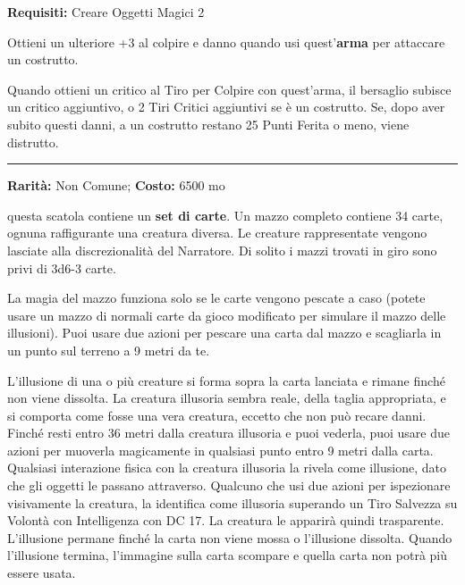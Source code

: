 \begin{multicols}{2}
\textbf{Requisiti:} Creare Oggetti Magici 2

Ottieni un ulteriore +3 al colpire e danno quando usi quest'\textbf{arma} per attaccare un costrutto.

Quando ottieni un critico al Tiro per Colpire con quest'arma, il bersaglio subisce un critico aggiuntivo, o 2 Tiri Critici aggiuntivi se è un costrutto. Se, dopo aver subito questi danni, a un costrutto restano 25 Punti Ferita o meno, viene distrutto.

\smallskip\noindent\rule{\linewidth}{2pt}  \hypertarget{MazzodelleIllusioni}{}\medskip{}\noindent\label{MazzodelleIllusioni}

\textbf{Rarità:} Non Comune; \textbf{Costo:} 6500 mo

questa scatola contiene un \textbf{set di carte}. Un mazzo completo contiene 34 carte, ognuna raffigurante una creatura diversa. Le creature rappresentate vengono lasciate alla discrezionalità del Narratore. Di solito i mazzi trovati in giro sono privi di 3d6-3 carte.

La magia del mazzo funziona solo se le carte vengono pescate a caso (potete usare un mazzo di normali carte da gioco modificato per simulare il mazzo delle illusioni). Puoi usare due azioni per pescare una carta dal mazzo e scagliarla in un punto sul terreno a 9 metri da te.

L'illusione di una o più creature si forma sopra la carta lanciata e rimane finché non viene dissolta. La creatura illusoria sembra reale, della taglia appropriata, e si comporta come fosse una vera creatura, eccetto che non può recare danni. Finché resti entro 36 metri dalla creatura illusoria e puoi vederla, puoi usare due azioni per muoverla magicamente in qualsiasi punto entro 9 metri dalla carta. Qualsiasi interazione fisica con la creatura illusoria la rivela come illusione, dato che gli oggetti le passano attraverso. Qualcuno che usi due azioni per ispezionare visivamente la creatura, la identifica come illusoria superando un Tiro Salvezza su Volontà con Intelligenza con DC 17. La creatura le apparirà quindi trasparente.
L'illusione permane finché la carta non viene mossa o l'illusione dissolta. Quando l'illusione termina, l'immagine sulla carta scompare e quella carta non potrà più essere usata.


\end{multicols}

